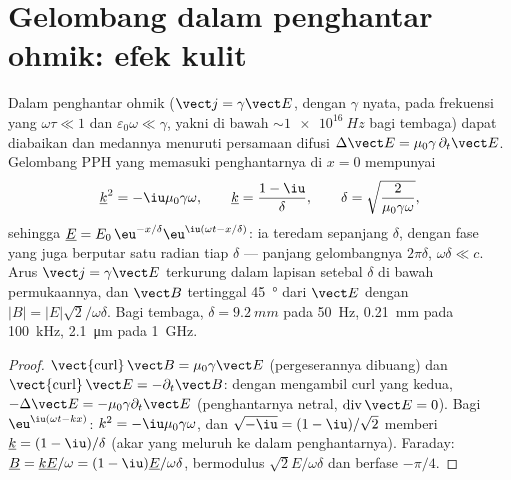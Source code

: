 \section{Gelombang dalam penghantar ohmik: efek kulit}

\begin{theorem}\label{thm:b2:waves-in-media:skin}
Dalam penghantar ohmik ($\vect j = \gamma\vect E$, dengan $\gamma$ nyata, pada frekuensi
yang $\omega\tau \ll 1$ dan $\varepsilon_0\omega \ll \gamma$, yakni di bawah $\sim\qty{1e16}{Hz}$ bagi
tembaga)  dapat diabaikan dan medannya menuruti
persamaan difusi $\Delta\vect E = \mu_0\gamma\,\partial_t\vect E$. Gelombang PPH yang memasuki
penghantarnya di $x = 0$ mempunyai
\[
\underline k^2 = -\iu\mu_0\gamma\omega , \qquad \underline k = \frac{1 - \iu}\delta , \qquad
\delta = \sqrt{\frac2{\mu_0\gamma\omega}} ,
\]
sehingga $\underline E = E_0\,\eu^{-x/\delta}\eu^{\iu(\omega t - x/\delta)}$: ia teredam
sepanjang \emph{} $\delta$, dengan fase yang juga berputar satu
radian tiap $\delta$ --- panjang gelombangnya $2\pi\delta$,  $\omega\delta \ll
c$. Arus $\vect j = \gamma\vect E$ terkurung dalam lapisan setebal
$\delta$ di bawah permukaannya, dan $\vect B$ tertinggal \qty{45}{\degree} dari $\vect E$ dengan
$|B| = |E|\sqrt2/\omega\delta$. Bagi tembaga, $\delta = \qty{9.2}{mm}$ pada \qty{50}{Hz},
\qty{0.21}{mm} pada \qty{100}{kHz}, \qty{2.1}{\micro m} pada \qty{1}{GHz}.
\end{theorem}

\begin{proof}
$\operatorname{\vect{curl}}\vect B = \mu_0\gamma\vect E$ (pergeserannya dibuang) dan
$\operatorname{\vect{curl}}\vect E = -\partial_t\vect B$: dengan mengambil curl yang kedua,
$-\Delta\vect E = -\mu_0\gamma\partial_t\vect E$ (penghantarnya netral, $\operatorname{div}
\vect E = 0$). Bagi $\eu^{\iu(\omega t - kx)}$: $k^2 = -\iu\mu_0\gamma\omega$, dan
$\sqrt{-\iu} = (1 - \iu)/\sqrt2$ memberi $\underline k = (1 - \iu)/\delta$ (akar yang
meluruh ke dalam penghantarnya). Faraday: $\underline B = \underline k\underline E/\omega = (1 - \iu)
\underline E/\omega\delta$, bermodulus $\sqrt2E/\omega\delta$ dan berfase $-\pi/4$.
\end{proof}

